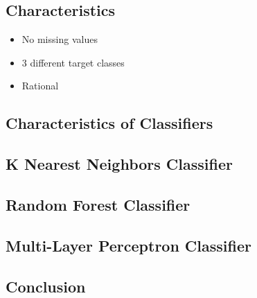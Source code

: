 \documentclass{article}
\begin{document}
\subsection{Characteristics}

\begin{itemize}
\item No missing values
\item 3 different target classes
\item Rational 
\end{itemize}


\subsection{Characteristics of Classifiers}


\subsection{K Nearest Neighbors Classifier}

\subsection{Random Forest Classifier}

\subsection{Multi-Layer Perceptron Classifier}

\subsection{Conclusion}
\end{document}
